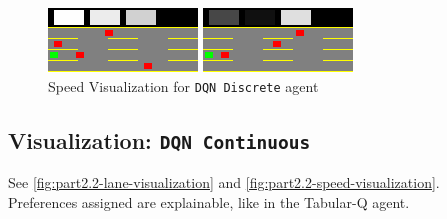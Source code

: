 \begin{figure}[H]
    \centering
    \begin{minipage}{0.48\textwidth}
        \centering
        \includegraphics[width=\linewidth]{plots/part2.1-speed_visualization_00_step_0500.png}
    \end{minipage}
    \hfill
    \begin{minipage}{0.48\textwidth}
        \centering
        \includegraphics[width=\linewidth]{plots/part2.1-speed_visualization_00_step_0660.png}
    \end{minipage}
    \caption{Speed Visualization for    \texttt{DQN Discrete} agent}
    \label{fig:part2.1-speed-visualization}
\end{figure}


\subsection{Visualization: \texttt{DQN Continuous}}
See \autoref{fig:part2.2-lane-visualization} and \autoref{fig:part2.2-speed-visualization}. Preferences assigned are explainable, like in the Tabular-Q agent.


